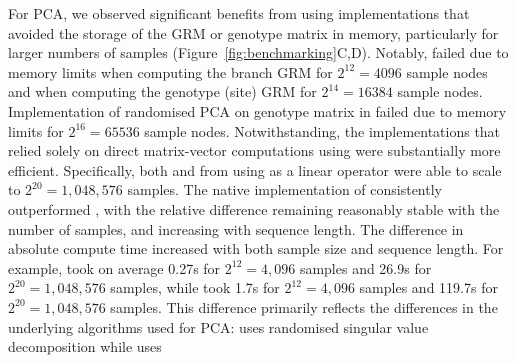 For PCA, we observed significant benefits from using implementations
that avoided the storage of the GRM or genotype matrix in memory,
particularly for larger numbers of samples (Figure~\ref{fig:benchmarking}C,D).
%
Notably, \tsGRM{} failed due to memory limits
when computing the branch GRM for $2^{12} = 4096$ sample nodes and
when computing the genotype (site) GRM for $2^{14} = 16384$ sample nodes.
%
Implementation of randomised PCA on genotype matrix in \scikitallel{}
failed due to memory limits for $2^{16} = 65536$ sample nodes.
%
Notwithstanding, the implementations that relied solely on
direct matrix-vector computations using \tskit{} were substantially more efficient.
%
Specifically, both \tsPCA{} and \eigsh{} from \scipy{} using \tsGRw{}
as a linear operator were able to scale to $2^{20} = 1,048,576$ samples.
%
The native implementation of \tsPCA{} consistently outperformed \eigsh{},
with the relative difference remaining reasonably stable with the number of samples,
and increasing with sequence length.
%
The difference in absolute compute time increased with both sample size and sequence length.
%
For example, \tsPCA{} took on average
0.27s for $2^{12} = 4,096$ samples and
26.9s for $2^{20} = 1,048,576$ samples,
while \eigsh{} took
  1.7s for $2^{12} = 4,096$ samples and
119.7s for $2^{20} = 1,048,576$ samples.
%
This difference primarily reflects the differences in the underlying algorithms used for PCA:
\tsPCA{} uses randomised singular value decomposition while \eigsh{} uses


